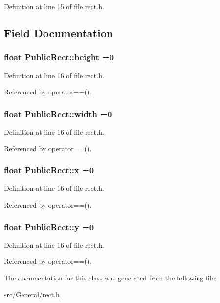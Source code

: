 Definition at line 15 of file rect.\-h.



\subsection{Field Documentation}
\hypertarget{class_public_rect_a9c2aef279c900310d3d0c8a351b7332f}{
\subsubsection[{height}]{\setlength{\rightskip}{0pt plus 5cm}float Public\-Rect\-::height =0}}\label{class_public_rect_a9c2aef279c900310d3d0c8a351b7332f}


Definition at line 16 of file rect.\-h.



Referenced by operator==().

\hypertarget{class_public_rect_ad9e87b1af7b2c11f35afaea9bd267871}{
\subsubsection[{width}]{\setlength{\rightskip}{0pt plus 5cm}float Public\-Rect\-::width =0}}\label{class_public_rect_ad9e87b1af7b2c11f35afaea9bd267871}


Definition at line 16 of file rect.\-h.



Referenced by operator==().

\hypertarget{class_public_rect_a9b85ada3510a3d217471cd93f699624b}{
\subsubsection[{x}]{\setlength{\rightskip}{0pt plus 5cm}float Public\-Rect\-::x =0}}\label{class_public_rect_a9b85ada3510a3d217471cd93f699624b}


Definition at line 16 of file rect.\-h.



Referenced by operator==().

\hypertarget{class_public_rect_ab37db90962870ddf84b7f8fbd62ab2ad}{
\subsubsection[{y}]{\setlength{\rightskip}{0pt plus 5cm}float Public\-Rect\-::y =0}}\label{class_public_rect_ab37db90962870ddf84b7f8fbd62ab2ad}


Definition at line 16 of file rect.\-h.



Referenced by operator==().



The documentation for this class was generated from the following file\-:\begin{DoxyCompactItemize}
\item 
src/\-General/\hyperlink{rect_8h}{rect.\-h}\end{DoxyCompactItemize}
